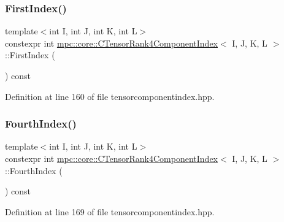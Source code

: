 \subsubsection{\texorpdfstring{First\+Index()}{FirstIndex()}}
{\footnotesize\ttfamily template$<$int I, int J, int K, int L$>$ \\
constexpr int \mbox{\hyperlink{classmpc_1_1core_1_1_c_tensor_rank4_component_index}{mpc\+::core\+::\+C\+Tensor\+Rank4\+Component\+Index}}$<$ I, J, K, L $>$\+::First\+Index (\begin{DoxyParamCaption}{ }\end{DoxyParamCaption}) const\hspace{0.3cm}{\ttfamily [inline]}}



Definition at line 160 of file tensorcomponentindex.\+hpp.

\mbox{\label{classmpc_1_1core_1_1_c_tensor_rank4_component_index_a8eb34d3c33fcf838cb74994696786032}} 
\subsubsection{\texorpdfstring{Fourth\+Index()}{FourthIndex()}}
{\footnotesize\ttfamily template$<$int I, int J, int K, int L$>$ \\
constexpr int \mbox{\hyperlink{classmpc_1_1core_1_1_c_tensor_rank4_component_index}{mpc\+::core\+::\+C\+Tensor\+Rank4\+Component\+Index}}$<$ I, J, K, L $>$\+::Fourth\+Index (\begin{DoxyParamCaption}{ }\end{DoxyParamCaption}) const\hspace{0.3cm}{\ttfamily [inline]}}



Definition at line 169 of file tensorcomponentindex.\+hpp.

\mbox{\label{classmpc_1_1core_1_1_c_tensor_rank4_component_index_a50a6d03a48cd2e837009be3db14c1c16}} 
